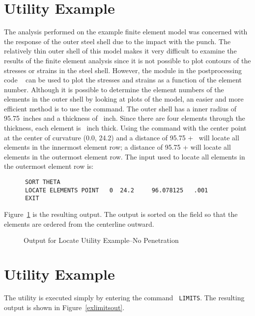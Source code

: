 \section{ Utility Example}

The analysis performed on the example finite element model was concerned
with the response of the outer steel shell due to the impact with the
punch.  The relatively thin outer shell of this model makes it very
difficult to examine the results of the finite element analysis since it
is not possible to plot contours of the stresses or strains in the steel
shell.  However, the  module in the postprocessing code
~\cite{BLOT} can be used to plot the stresses and strains as
a function of the element number.  Although it is possible to determine
the element numbers of the elements in the outer shell by looking at
plots of the model, an easier and more efficient method is to use the
 command.  The outer shell has a inner radius of
95.75~inches and a thickness of ~inch.  Since there are four
elements through the thickness, each element is ~inch thick.
Using the  command with the center point at the center
of curvature (0.0, 24.2) and a distance of 95.75 + \ will
locate all elements in the innermost element row; a distance of 95.75 +
 will locate all elements in the outermost element row.
The input used to locate all elements in the outermost element row is:

\begin{verbatim}
      SORT THETA
      LOCATE ELEMENTS POINT   0  24.2     96.078125   .001
      EXIT
\end{verbatim}

Figure~\ref{exlocateout} is the resulting output.  The output is sorted
on the  field so that the elements are ordered from the
centerline outward. 

\begin{figure}

\caption{Output for Locate Utility Example--No Penetration}\label{exlocateout}
\end{figure}

\section{ Utility Example}
The  utility is executed simply by entering the command {\tt
LIMITS}.  The resulting output is shown in Figure~\ref{exlimitsout}.

